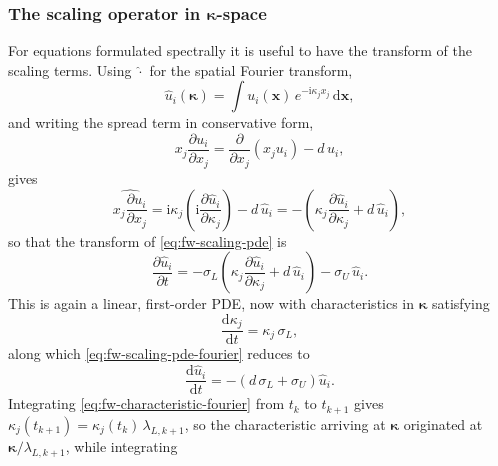 \documentclass{article}
\begin{document}
\subsubsection{The scaling operator in \texorpdfstring{$\boldsymbol{\kappa}$}{kappa}-space}\label{sssec:fw-scaling-fourier}

For equations formulated spectrally it is useful to have the transform of the
scaling terms. Using $\widehat{\cdot}$ for the spatial Fourier transform,
\begin{equation}\label{eq:fw-fourier-convention}
  \hat{u}_i(\boldsymbol{\kappa}) = \int u_i(\mathbf{x})\, e^{-\mathrm{i} \kappa_j x_j}\, \mathrm{d}\mathbf{x},
\end{equation}
and writing the spread term in conservative form,
\begin{equation}\label{eq:fw-scaling-divform}
  x_j \frac{\partial u_i}{\partial x_j}
  = \frac{\partial}{\partial x_j}\left( x_j u_i \right) - d\, u_i,
\end{equation}
gives
\begin{equation}\label{eq:fw-fourier-scaling}
  \widehat{x_j \frac{\partial u_i}{\partial x_j}}
  = \mathrm{i} \kappa_j \left( \mathrm{i} \frac{\partial \hat{u}_i}{\partial \kappa_j} \right) - d\, \hat{u}_i
  = -\left( \kappa_j \frac{\partial \hat{u}_i}{\partial \kappa_j} + d\, \hat{u}_i \right),
\end{equation}
so that the transform of \eqref{eq:fw-scaling-pde} is
\begin{equation}\label{eq:fw-scaling-pde-fourier}
  \frac{\partial \hat{u}_i}{\partial t}
  = -\sigma_L \left( \kappa_j \frac{\partial \hat{u}_i}{\partial \kappa_j} + d\, \hat{u}_i \right)
  - \sigma_U\, \hat{u}_i .
\end{equation}
This is again a linear, first-order PDE, now with characteristics in
$\boldsymbol{\kappa}$ satisfying
\begin{equation}\label{eq:fw-characteristic-fourier}
  \frac{\mathrm{d} \kappa_j}{\mathrm{d} t} = \kappa_j\, \sigma_L ,
\end{equation}
along which \eqref{eq:fw-scaling-pde-fourier} reduces to
\begin{equation}\label{eq:fw-scaling-ode-fourier}
  \frac{\mathrm{d} \hat{u}_i}{\mathrm{d} t} = -\left( d\, \sigma_L + \sigma_U \right) \hat{u}_i .
\end{equation}
Integrating \eqref{eq:fw-characteristic-fourier} from $t_k$ to $t_{k+1}$ gives
$\kappa_j(t_{k+1}) = \kappa_j(t_k)\, \lambda_{L,k+1}$, so the characteristic arriving at
$\boldsymbol{\kappa}$ originated at $\boldsymbol{\kappa} / \lambda_{L,k+1}$, while integrating
\end{document}
